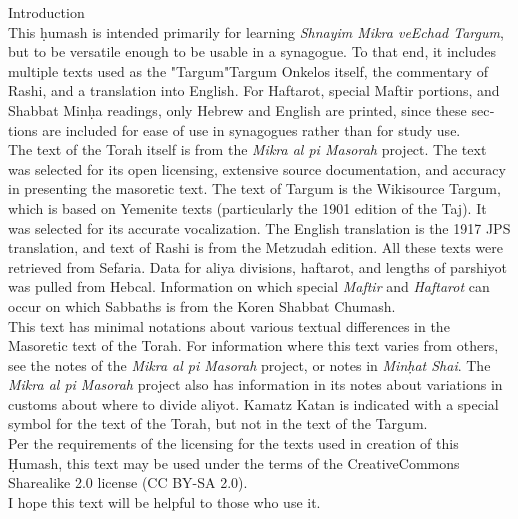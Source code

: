 \begin{minipage}{\textwidth}\englishfont
	
\begin{english}
\vspace{16pt}
\Large Introduction\vspace{12pt}\\
\normalsize
This \d{h}umash is intended primarily for learning \textit{Shnayim Mikra veEchad Targum}, but to be versatile enough to be usable in a synagogue. To that end, it includes multiple texts used as the "Targum"\textemdash Targum Onkelos itself, the commentary of Rashi, and a translation into English.  For Haftarot, special Maftir portions, and Shabbat Min\d{h}a readings, only Hebrew and English are printed, since these sections are included for ease of use in synagogues rather than for study use.\\

The text of the Torah itself is from the \textit{Mikra al pi Masorah} project\nocite{MAPM}. The text was selected for its open licensing, extensive source documentation, and accuracy in presenting the masoretic text.  The text of Targum is the Wikisource Targum\nocite{targum}, which is based on Yemenite texts (particularly the 1901 edition of the Taj). It was selected for its accurate vocalization.
The English translation is the 1917 JPS translation\nocite{1917JPS}, and text of Rashi is from the Metzudah edition\nocite{metzudah_rashi}.  All these texts were retrieved from Sefaria. Data for aliya divisions, haftarot, and lengths of parshiyot was pulled from Hebcal. Information on which special \textit{Maftir} and \textit{Haftarot} can occur on which Sabbaths is from the Koren Shabbat Chumash\nocite{koren_shabbat}.\\

This text has minimal notations about various textual differences in the Masoretic text of the Torah. For information where this text varies from others, see the notes of the \textit{Mikra al pi Masorah} project, or notes in \textit{Min\d{h}at Shai}. The \textit{Mikra al pi Masorah} project also has information in its notes about variations in customs about where to divide aliyot. Kamatz Katan is indicated with a special symbol for the text of the Torah, but not in the text of the Targum.\\

Per the requirements of the licensing for the texts used in creation of this \d{H}umash, this text may be used under the terms of the CreativeCommons Sharealike 2.0 license (CC BY-SA 2.0).\\

I hope this text will be helpful to those who use it.

\end{english}

\end{minipage}


